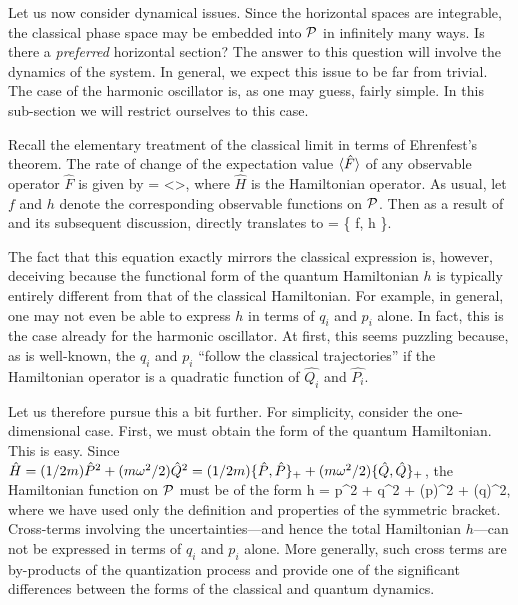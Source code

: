 Let us now consider dynamical issues.  Since the horizontal spaces are
integrable, the classical phase space may be embedded into $\P$ in
infinitely many ways.  Is there a {\em preferred} horizontal section?
The answer to this question will involve the dynamics of the system.
In general, we expect this issue to be far from trivial.  The case of
the harmonic oscillator is, as one may guess, fairly simple. In this
sub-section we will restrict ourselves to this case. 

Recall the elementary treatment of the classical limit in terms of
Ehrenfest's theorem.  The rate of change of the expectation value
$\< \hat{F} \>$ of any observable operator $\hat{F}$ is given by
%
\be \label{ehrenfest}
 \<  \> =  
\left< \right>,
\ee
%
where $\hat{H}$ is the Hamiltonian operator.  As usual, let $f$ and
$h$ denote the corresponding observable functions on $\P$.  Then as a
result of  and its subsequent discussion, 
directly translates to
%
\be
	 = \{ f, h \}.
\ee
%

The fact that this equation exactly mirrors the classical expression
is, however, deceiving because the functional form of the quantum
Hamiltonian $h$ is typically entirely different from that of the
classical Hamiltonian.  For example, in general, one may not even be
able to express $h$ in terms of $q_i$ and $p_i$ alone. In fact, this
is the case already for the harmonic oscillator. At first, this seems
puzzling because, as is well-known, the $q_i$ and $p_i$ ``follow the
classical trajectories'' if the Hamiltonian operator is a quadratic
function of $\hat{Q_i}$ and $\hat{P_i}$.

Let us therefore pursue this a bit further. For simplicity,
consider the one-dimensional case.  First, we must obtain the form of
the quantum Hamiltonian.  This is easy.  Since $ \hat{H} = (1 /
2m)\hat{P}^2 + (m\w^2 / 2)\hat{Q}^2 = (1 / 2m) \{ \hat{P}, \hat{P}
\}_+ + (m\w^2 / 2) \{ \hat{Q}, \hat{Q} \}_+$, the Hamiltonian function
on $\P$ must be of the form
%
\be h = p^2 + q^2 +
(\Delta p)^2 + (\Delta q)^2, \ee 
%
where we have used only the definition and properties of the symmetric
bracket.  Cross-terms involving the uncertainties---and hence the
total Hamiltonian $h$---can not be expressed in terms of $q_i$ and
$p_i$ alone. More generally, such cross terms are by-products of the
quantization process and provide one of the significant differences
between the forms of the classical and quantum dynamics.

